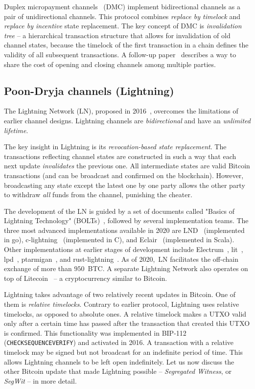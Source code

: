 Duplex micropayment channels~\cite{Decker2015} (DMC) implement bidirectional channels as a pair of unidirectional channels.
This protocol combines \textit{replace by timelock} and \textit{replace by incentive} state replacement.
The key concept of DMC is \textit{invalidation tree} -- a hierarchical transaction structure that allows for invalidation of old channel states, because the timelock of the first transaction in a chain defines the validity of all subsequent transactions.
A follow-up paper~\cite{Burchert2017} describes a way to share the cost of opening and closing channels among multiple parties.


\subsection{Poon-Dryja channels (Lightning)}

The Lightning Network (LN), proposed in 2016~\cite{Poon2016}, overcomes the limitations of earlier channel designs.
Lightning channels are \textit{bidirectional} and have an \textit{unlimited lifetime}.

The key insight in Lightning is its \textit{revocation-based state replacement}.
The transactions reflecting channel states are constructed in such a way that each next update \textit{invalidates} the previous one.
All intermediate states are valid Bitcoin transactions (and can be broadcast and confirmed on the blockchain).
However, broadcasting any state except the latest one by one party allows the other party to withdraw \textit{all} funds from the channel, punishing the cheater.

The development of the LN is guided by a set of documents called "Basics of Lightning Technology" (BOLTs)~\cite{BOLT}, followed by several implementation teams.
The three most advanced implementations available in 2020 are LND~\cite{LND} (implemented in go), c-lightning~\cite{clightning} (implemented in C), and Eclair~\cite{Eclair} (implemented in Scala).
Other implementations at earlier stages of development include Electrum~\cite{ElectrumWebsite, ElectrumLightningAnnounce}, lit~\cite{lit}, lpd~\cite{lpd}, ptarmigan~\cite{ptarmigan}, and rust-lightning~\cite{rustlightning}.
As of 2020,~LN facilitates the off-chain exchange of more than $950$~BTC\@.
A separate Lightning Network also operates on top of Litecoin~\cite{1MLLitecoin} -- a cryptocurrency similar to Bitcoin.

Lightning takes advantage of two relatively recent updates in Bitcoin.
One of them is \textit{relative timelocks}.
Contrary to earlier protocol, Lightning uses relative timelocks, as opposed to absolute ones.
A relative timelock makes a UTXO valid only after a certain time has passed after the transaction that created this UTXO is confirmed.
This functionality was implemented in BIP-112~\cite{BtcDrak2015} (\texttt{CHECKSEQUENCEVERIFY}) and activated in 2016.
A transaction with a relative timelock may be signed but not broadcast for an indefinite period of time.
This allows Lightning channels to be left open indefinitely.
Let us now discuss the other Bitcoin update that made Lightning possible -- \textit{Segregated Witness}, or \textit{SegWit} -- in more detail.


